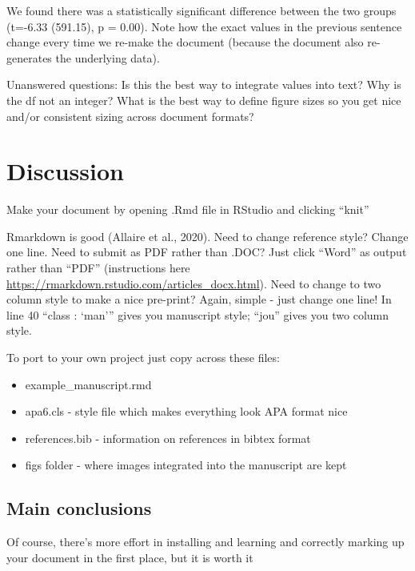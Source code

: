 \documentclass[
  english,
  ,jou,floatsintext]{apa6}
\providecommand{\tightlist}{%
  \setlength{\itemsep}{0pt}\setlength{\parskip}{0pt}}
\begin{document}
We found there was a statistically significant difference between the two groups (t=-6.33 (591.15), p = 0.00). Note how the exact values in the previous sentence change every time we re-make the document (because the document also re-generates the underlying data).

Unanswered questions: Is this the best way to integrate values into text? Why is the df not an integer? What is the best way to define figure sizes so you get nice and/or consistent sizing across document formats?

\hypertarget{discussion}{%
\section{Discussion}\label{discussion}}

Make your document by opening .Rmd file in RStudio and clicking \enquote{knit}

Rmarkdown is good (Allaire et al., 2020). Need to change reference style? Change one line. Need to submit as PDF rather than .DOC? Just click \enquote{Word} as output rather than \enquote{PDF} (instructions here \url{https://rmarkdown.rstudio.com/articles_docx.html}). Need to change to two column style to make a nice pre-print? Again, simple - just change one line! In line 40 \enquote{class : \enquote{man}} gives you manuscript style; \enquote{jou} gives you two column style.

To port to your own project just copy across these files:

\begin{itemize}
\tightlist
\item
  example\_manuscript.rmd
\item
  apa6.cls - style file which makes everything look APA format nice
\item
  references.bib - information on references in bibtex format
\item
  figs folder - where images integrated into the manuscript are kept
\end{itemize}

\hypertarget{main-conclusions}{%
\subsection{Main conclusions}\label{main-conclusions}}

Of course, there's more effort in installing and learning and correctly marking up your document in the first place, but it is worth it
\end{document}
